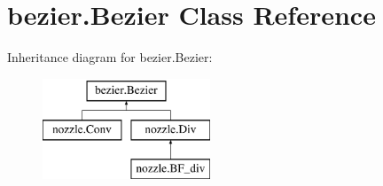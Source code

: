 \hypertarget{classbezier_1_1Bezier}{\section{bezier.\-Bezier \-Class \-Reference}
\label{classbezier_1_1Bezier}
}
\-Inheritance diagram for bezier.\-Bezier\-:\begin{figure}[H]
\begin{center}
\leavevmode
\includegraphics[height=3.000000cm]{classbezier_1_1Bezier}
\end{center}
\end{figure}

